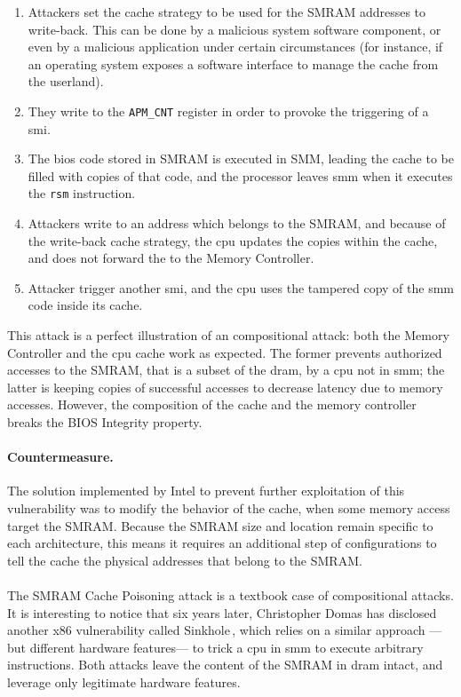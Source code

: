 \begin{enumerate}
\item Attackers set the cache strategy to be used for the SMRAM addresses to
  write-back.
  This can be done by a malicious system software component, or even by a
  malicious application under certain circumstances (for instance, if an
  operating system exposes a software interface to manage the cache from the
  userland).

%
\item They write to the \texttt{APM\_CNT} register in order to provoke the
  triggering of a \ac{smi}.
%
\item The \ac{bios} code stored in SMRAM is executed in SMM, leading the cache
  to be filled with copies of that code, and the processor leaves \ac{smm} when
  it executes the \texttt{rsm} instruction.
%
\item Attackers write to an address which belongs to the SMRAM, and because of
  the write-back cache strategy, the \ac{cpu} updates the copies within the
  cache, and does not forward the \IO to the Memory Controller.
%
\item Attacker trigger another \ac{smi}, and the \ac{cpu} uses the tampered copy
  of the \ac{smm} code inside its cache.
\end{enumerate}
%
This attack is a perfect illustration of an compositional attack:
%
both the Memory Controller and the \ac{cpu} cache work as expected.
%
The former prevents authorized accesses to the SMRAM, that is a subset of the
\ac{dram}, by a \ac{cpu} not in \ac{smm};
%
the latter is keeping copies of successful accesses to decrease latency due to
memory accesses.
%
However, the composition of the cache and the memory controller breaks the BIOS
Integrity property.

\paragraph{Countermeasure.}
%
The solution implemented by Intel to prevent further exploitation of this
vulnerability was to modify the behavior of the cache, when some memory access
target the SMRAM.
%
Because the SMRAM size and location remain specific to each architecture, this
means it requires an additional step of configurations to tell the cache the
physical addresses that belong to the SMRAM.

\paragraph{}
%
The SMRAM Cache Poisoning attack is a textbook case of compositional attacks.
%
It is interesting to notice that six years later, Christopher Domas has
disclosed another x86 vulnerability called Sinkhole\,\cite{domas2015sinkhole},
which relies on a similar approach ---but different hardware features--- to
trick a \ac{cpu} in \ac{smm} to execute arbitrary instructions.
%
Both attacks leave the content of the SMRAM in \ac{dram} intact, and leverage
only legitimate hardware features.

